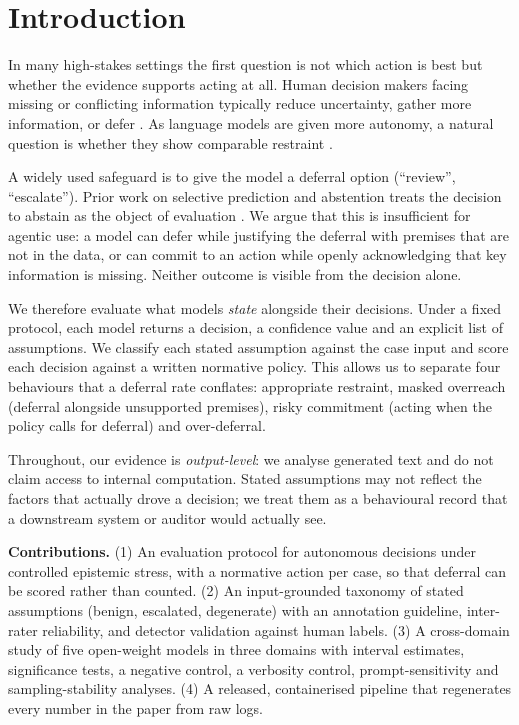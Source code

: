 \section{Introduction}\label{sec:intro}
In many high-stakes settings the first question is not which action is best but whether the evidence supports acting at all. Human decision makers facing missing or conflicting information typically reduce uncertainty, gather more information, or defer \cite{lipshitz1997coping}. As language models are given more autonomy, a natural question is whether they show comparable restraint \cite{amodei2016concrete}.

A widely used safeguard is to give the model a deferral option (``review'', ``escalate''). Prior work on selective prediction and abstention treats the decision to abstain as the object of evaluation \cite{geifman2017selective,wen2025abstention}. We argue that this is insufficient for agentic use: a model can defer while justifying the deferral with premises that are not in the data, or can commit to an action while openly acknowledging that key information is missing. Neither outcome is visible from the decision alone.

We therefore evaluate what models \emph{state} alongside their decisions. Under a fixed protocol, each model returns a decision, a confidence value and an explicit list of assumptions. We classify each stated assumption against the case input and score each decision against a written normative policy. This allows us to separate four behaviours that a deferral rate conflates: appropriate restraint, masked overreach (deferral alongside unsupported premises), risky commitment (acting when the policy calls for deferral) and over-deferral.

Throughout, our evidence is \emph{output-level}: we analyse generated text and do not claim access to internal computation. Stated assumptions may not reflect the factors that actually drove a decision; we treat them as a behavioural record that a downstream system or auditor would actually see.

\textbf{Contributions.}
(1) An evaluation protocol for autonomous decisions under controlled epistemic stress, with a normative action per case, so that deferral can be scored rather than counted.
(2) An input-grounded taxonomy of stated assumptions (benign, escalated, degenerate) with an annotation guideline, inter-rater reliability, and detector validation against human labels.
(3) A cross-domain study of five open-weight models in three domains with interval estimates, significance tests, a negative control, a verbosity control, prompt-sensitivity and sampling-stability analyses.
(4) A released, containerised pipeline that regenerates every number in the paper from raw logs.
